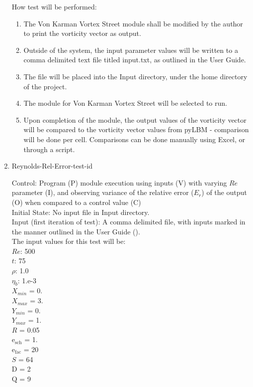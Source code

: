 \documentclass[12pt, titlepage]{article}
\newcounter{testcounter} %
\begin{document}
\begin{enumerate}
How test will be performed: 

\begin{enumerate}
\item The Von Karman Vortex Street module shall be modified by the author to print the vorticity vector as output.
\item Outside of the system, the input parameter values will be written to a comma delimited text file titled input.txt, as outlined in the User Guide.
\item The file will be placed into the Input directory, under the home directory of the project.
\item The module for Von Karman Vortex Street will be selected to run.
\item Upon completion of the module, the output values of the vorticity vector will be compared to the vorticity vector values from pyLBM - comparison will be done per cell. Comparisons can be done manually using Excel, or through a script.\\
\end{enumerate}

\item{Reynolds-Rel-Error-test-id\thetestcounter \\}

Control: Program (P) module execution using  inputs (V) with varying $Re$ parameter (I), and observing variance of the relative error ($E_r$) of the output (O) when compared to a control value (C) \\
					
Initial State: No input file in Input directory.\\
					
Input (first iteration of test): A comma delimited file, with inputs marked in the manner outlined in the User Guide (\citet{LBM_UserGuide_PM}).\\The input values for this test will be:\\
$Re$: 500\\
$t$: 75\\
$\rho$: 1.0\\
$\eta_b$: 1.e-3\\
$X_{min}$ = 0.\\
$X_{max}$ = 3.\\
$Y_{min}$ = 0.\\
$Y_{max}$ = 1.\\
$R$ = 0.05\\
$\mathrm{e_{sch}}$ = 1.\\
$\mathrm{e_{fac}}$ = 20\\
$S$ = 64\\
$\mathrm{D}$ = 2\\
$\mathrm{Q}$ = 9\\


\end{enumerate}
\end{document}
